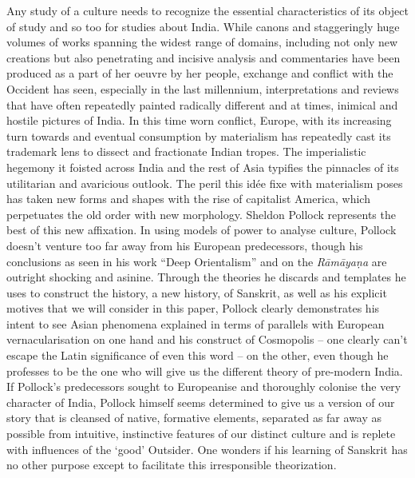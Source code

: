 Any study of a culture needs to recognize the essential characteristics of its object of study and so too for studies about India. While canons and staggeringly huge volumes of works spanning the widest range of domains, including not only new creations but also penetrating and incisive analysis and commentaries have been produced as a part of her oeuvre by her people, exchange and conflict with the Occident has seen, especially in the last millennium, interpretations and reviews that have often repeatedly painted radically different and at times, inimical and hostile pictures of India. In this time worn conflict, Europe, with its increasing turn towards and eventual consumption by materialism has repeatedly cast its trademark lens to dissect and fractionate Indian tropes. The imperialistic hegemony it foisted across India and the rest of Asia typifies the pinnacles of its utilitarian and avaricious outlook. The peril this idée fixe with materialism poses has taken new forms and shapes with the rise of capitalist America, which perpetuates the old order with new morphology. Sheldon Pollock represents the best of this new affixation. In using models of power to analyse culture, Pollock doesn’t venture too far away from his European predecessors, though his conclusions as seen in his work “Deep Orientalism” and on the \textit{Rāmāyaṇa} are outright shocking and asinine. Through the theories he discards and templates he uses to construct the history, a new history, of Sanskrit, as well as his explicit motives that we will consider in this paper, Pollock clearly demonstrates his intent to see Asian phenomena explained in terms of parallels with European vernacularisation on one hand and his construct of Cosmopolis – one clearly can’t escape the Latin significance of even this word – on the other, even though he professes to be the one who will give us the different theory of pre-modern India. If Pollock’s predecessors sought to Europeanise and thoroughly colonise the very character of India, Pollock himself seems determined to give us a version of our story that is cleansed of native, formative elements, separated as far away as possible from intuitive, instinctive features of our distinct culture and is replete with influences of the ‘good’ Outsider. One wonders if his learning of Sanskrit has no other purpose except to facilitate this irresponsible theorization.

